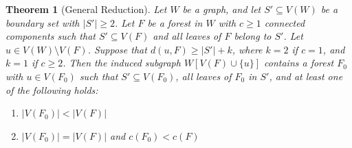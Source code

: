 \documentclass[10pt,a4paper]{amsart}
\newtheorem{theorem}{Theorem}
\begin{document}
\begin{theorem}[General Reduction]\label{thm:unified}
Let $W$ be a graph, and let $S' \subseteq V(W)$ be a boundary set with $|S'| \ge 2$. Let $F$ be a forest in $W$ with $c \ge 1$ connected components such that $S' \subseteq V(F)$ and all leaves of $F$ belong to $S'$. Let $u \in V(W) \setminus V(F)$. Suppose that $d(u, F) \ge |S'| + k$, where $k = 2$ if $c = 1$, and $k = 1$ if $c \ge 2$. Then the induced subgraph $W[V(F) \cup \{u\}]$ contains a forest $F_0$ with $u \in V(F_0)$ such that $S' \subseteq V(F_0)$, all leaves of $F_0$ in $S'$, and at least one of the following holds:
\begin{enumerate}
    \item $|V(F_0)| < |V(F)|$ \quad {}
    \item $|V(F_0)| = |V(F)|$ and $c(F_0) < c(F)$ \quad {}
\end{enumerate}
\end{theorem}
\end{document}
